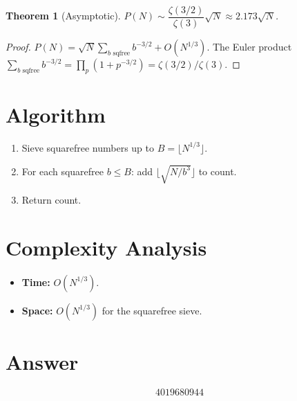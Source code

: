 \documentclass[11pt]{article}
\newtheorem{theorem}{Theorem}
\begin{document}
\begin{theorem}[Asymptotic]
$P(N) \sim \dfrac{\zeta(3/2)}{\zeta(3)}\sqrt{N} \approx 2.173\sqrt{N}$.
\end{theorem}

\begin{proof}
$P(N) = \sqrt{N}\sum_{b\text{ sqfree}}b^{-3/2} + O(N^{1/3})$. The Euler product $\sum_{b\text{ sqfree}}b^{-3/2} = \prod_p(1+p^{-3/2}) = \zeta(3/2)/\zeta(3)$.
\end{proof}

\section{Algorithm}

\begin{enumerate}
\item Sieve squarefree numbers up to $B = \lfloor N^{1/3}\rfloor$.
\item For each squarefree $b \le B$: add $\lfloor\sqrt{N/b^3}\rfloor$ to count.
\item Return count.
\end{enumerate}

\section{Complexity Analysis}

\begin{itemize}
\item \textbf{Time:} $O(N^{1/3})$.
\item \textbf{Space:} $O(N^{1/3})$ for the squarefree sieve.
\end{itemize}

\section{Answer}

\[
\boxed{4019680944}
\]
\end{document}
